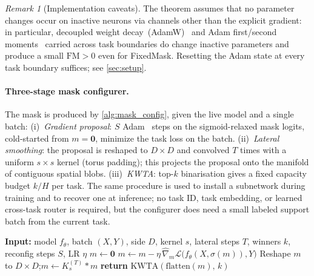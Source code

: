 \documentclass{article}
\theoremstyle{plain}
\theoremstyle{remark}
\newtheorem{remark}[theorem]{Remark}
\begin{document}
\begin{remark}[Implementation caveats]
\label{rem:caveats}
The theorem assumes that no parameter changes occur on inactive neurons via channels other than the explicit gradient: in particular, decoupled weight decay~(AdamW)~\citep{loshchilov2019decoupled} and Adam first/second moments~\citep{kingma2015adam} carried across task boundaries do change inactive parameters and produce a small $\mathrm{FM}>0$ even for FixedMask. Resetting the Adam state at every task boundary suffices; see \cref{sec:setup}.
\end{remark}

\paragraph{Three-stage mask configurer.}
The mask is produced by \cref{alg:mask_config}, given the live model and a single batch:
(i)~\emph{Gradient proposal}: $S$ Adam~\citep{kingma2015adam} steps on the sigmoid-relaxed mask logits, cold-started from $m=\mathbf{0}$, minimize the task loss on the batch.
(ii)~\emph{Lateral smoothing}: the proposal is reshaped to $D\times D$ and convolved $T$ times with a uniform $s\times s$ kernel (torus padding); this projects the proposal onto the manifold of contiguous spatial blobs.
(iii)~\emph{KWTA}: top-$k$ binarisation gives a fixed capacity budget $k/H$ per task.
The same procedure is used to install a subnetwork during training and to recover one at inference; no task ID, task embedding, or learned cross-task router is required, but the configurer does need a small labeled support batch from the current task.

\begin{algorithm}[t]
\caption{\textsc{SmoothKWTA} mask configurer}
\label{alg:mask_config}
\begin{algorithmic}[1]
\STATE \textbf{Input:} model $f_\theta$, batch $(X,Y)$, side $D$, kernel $s$, lateral steps $T$, winners $k$, reconfig steps $S$, LR $\eta$
\STATE $m\leftarrow\mathbf{0}$
  \STATE $m\leftarrow m-\eta\,\widehat\nabla_m\mathcal{L}\bigl(f_\theta(X,\sigma(m)),Y\bigr)$
\ENDFOR
\STATE Reshape $m$ to $D\times D$;\quad $m\leftarrow K_s^{(T)}*m$
\STATE \textbf{return} $\mathrm{KWTA}(\mathrm{flatten}(m),\,k)$
\end{algorithmic}
\end{algorithm}
\end{document}
